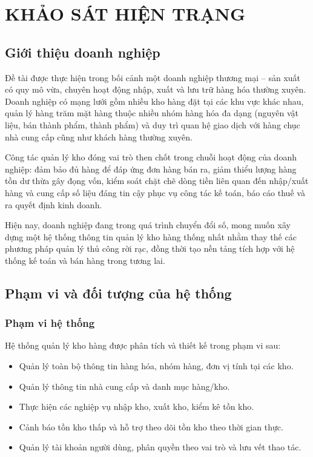 \chapter{KHẢO SÁT HIỆN TRẠNG}

\section{Giới thiệu doanh nghiệp}

Đề tài được thực hiện trong bối cảnh một doanh nghiệp thương mại -- sản xuất có quy mô vừa, chuyên hoạt động nhập, xuất và lưu trữ hàng hóa thường xuyên. Doanh nghiệp có mạng lưới gồm nhiều kho hàng đặt tại các khu vực khác nhau, quản lý hàng trăm mặt hàng thuộc nhiều nhóm hàng hóa đa dạng (nguyên vật liệu, bán thành phẩm, thành phẩm) và duy trì quan hệ giao dịch với hàng chục nhà cung cấp cũng như khách hàng thường xuyên.

Công tác quản lý kho đóng vai trò then chốt trong chuỗi hoạt động của doanh nghiệp: đảm bảo đủ hàng để đáp ứng đơn hàng bán ra, giảm thiểu lượng hàng tồn dư thừa gây đọng vốn, kiểm soát chặt chẽ dòng tiền liên quan đến nhập/xuất hàng và cung cấp số liệu đáng tin cậy phục vụ công tác kế toán, báo cáo thuế và ra quyết định kinh doanh.

Hiện nay, doanh nghiệp đang trong quá trình chuyển đổi số, mong muốn xây dựng một hệ thống thông tin quản lý kho hàng thống nhất nhằm thay thế các phương pháp quản lý thủ công rời rạc, đồng thời tạo nền tảng tích hợp với hệ thống kế toán và bán hàng trong tương lai.

\section{Phạm vi và đối tượng của hệ thống}

\subsection{Phạm vi hệ thống}

Hệ thống quản lý kho hàng được phân tích và thiết kế trong phạm vi sau:

\begin{itemize}[leftmargin=1.5cm]
    \item Quản lý toàn bộ thông tin hàng hóa, nhóm hàng, đơn vị tính tại các kho.
    \item Quản lý thông tin nhà cung cấp và danh mục hàng/kho.
    \item Thực hiện các nghiệp vụ nhập kho, xuất kho, kiểm kê tồn kho.
    \item Cảnh báo tồn kho thấp và hỗ trợ theo dõi tồn kho theo thời gian thực.
    \item Quản lý tài khoản người dùng, phân quyền theo vai trò và lưu vết thao tác.
\end{itemize}

